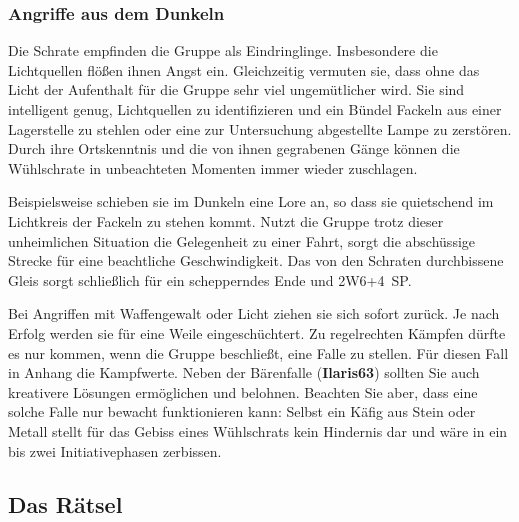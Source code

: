 \documentclass[openright]{Ilaris}
\begin{document}
\subsubsection{Angriffe aus dem Dunkeln}
Die Schrate empfinden die Gruppe als Eindringlinge.
Insbesondere die Lichtquellen flößen ihnen Angst ein.
Gleichzeitig vermuten sie, dass ohne das Licht der Aufenthalt für die Gruppe sehr viel ungemütlicher wird.
Sie sind intelligent genug, Lichtquellen zu identifizieren und ein Bündel Fackeln aus einer Lagerstelle zu stehlen oder eine zur Untersuchung abgestellte Lampe zu zerstören.
Durch ihre Ortskenntnis und die von ihnen gegrabenen Gänge können die Wühlschrate in unbeachteten Momenten immer wieder zuschlagen.

 Beispielsweise schieben sie im Dunkeln eine Lore an, so dass sie quietschend im Lichtkreis der Fackeln zu stehen kommt.
Nutzt die Gruppe trotz dieser unheimlichen Situation die Gelegenheit zu einer Fahrt, sorgt die abschüssige Strecke für eine beachtliche Geschwindigkeit.
Das von den Schraten durchbissene Gleis sorgt schließlich für ein schepperndes Ende und 2W6+4~SP.

Bei Angriffen mit Waffengewalt oder Licht ziehen sie sich sofort zurück. Je nach Erfolg werden sie für eine Weile eingeschüchtert.
Zu regelrechten Kämpfen dürfte es nur kommen, wenn die Gruppe beschließt, eine Falle zu stellen.
Für diesen Fall in Anhang die Kampfwerte.
Neben der Bärenfalle (\textbf{Ilaris63}) sollten Sie auch kreativere Lösungen ermöglichen und belohnen.
Beachten Sie aber, dass eine solche Falle nur bewacht funktionieren kann:
Selbst ein Käfig aus Stein oder Metall stellt für das Gebiss eines Wühlschrats kein Hindernis dar und wäre in ein bis zwei Initiativephasen zerbissen.


\subsection{Das Rätsel}
\end{document}
